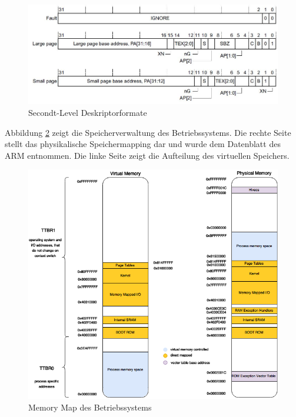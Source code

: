 \begin{figure}[H]
	\includegraphics[scale=0.7]{figures/secondLevelDescriptor}
	\caption{Secondt-Level Deskriptorformate \cite[S. B3-1327]{ARM:ARM}}
	\label{fig:secondLevelDescriptor}
\end{figure}


Abbildung \ref{fig:MemoryMap} zeigt die Speicherverwaltung des Betriebssystems. Die rechte Seite stellt das physikalische Speichermapping dar und wurde dem Datenblatt des ARM \cite[S. 155]{ARM:TRM} entnommen. Die linke Seite zeigt die Aufteilung des virtuellen Speichers.\\

\begin{figure}[H]
	\includegraphics[scale=0.7]{figures/MemoryMap}
	\caption{Memory Map des Betriebssystems}
	\label{fig:MemoryMap}
\end{figure}

